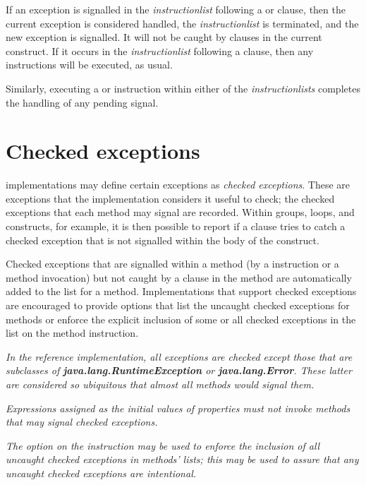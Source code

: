 If an exception is signalled in the \emph{instructionlist} following
a  or  clause, then the current exception
is considered handled, the \emph{instructionlist} is terminated, and
the new exception is signalled.  It will not be caught by 
clauses in the current construct.  If it occurs in the
\emph{instructionlist} following a  clause, then any
 instructions will be executed, as usual.
 
Similarly, executing a 
or  instruction within either of the
\emph{instructionlists} completes the handling of any pending
signal.
\section{Checked exceptions}\label{refchecked}
 
\nr{} implementations may define certain exceptions as \emph{checked
exceptions}.  These are exceptions that the implementation considers
it useful to check; the checked exceptions that each method may signal
are recorded.  Within  groups,  loops, and
 constructs, for example, it is then possible to report
if a  clause tries to catch a checked exception that is
not signalled within the body of the construct.
 
Checked exceptions that are signalled within a method (by a
 instruction or a method invocation) but not caught by a
 clause in the method are automatically added to the
 list for a method.  Implementations that support
checked exceptions are encouraged to provide options that list the
uncaught checked exceptions for methods or enforce the explicit
inclusion of some or all checked exceptions in the  list
on the method instruction.
 
\emph{In the reference implementation, all exceptions are checked except
those that are subclasses of \textbf{java.lang.RuntimeException}
or \textbf{java.lang.Error}.  These latter are considered so
ubiquitous that almost all methods would signal them.}
 
\emph{Expressions assigned as the initial values of properties must not invoke
methods that may signal checked exceptions.}
 
\emph{The  option on the  instruction may
be used to enforce the inclusion of all uncaught checked exceptions in
methods'  lists; this may be used to assure that
any uncaught checked exceptions are intentional.}
